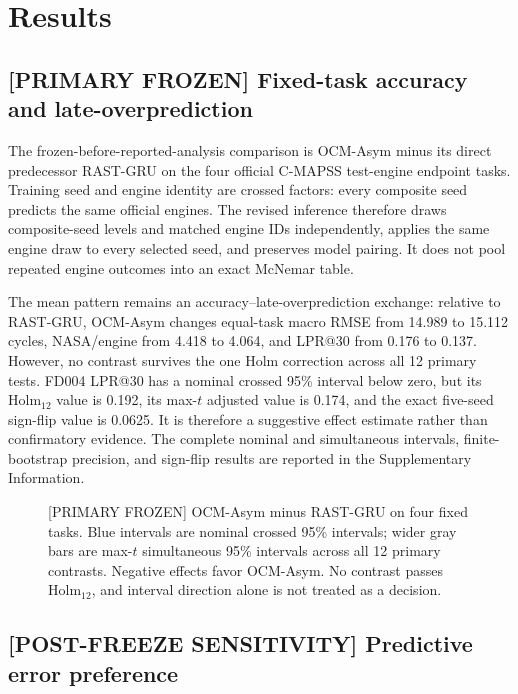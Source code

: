 
\FloatBarrier
\section{Results}

\subsection{[PRIMARY FROZEN] Fixed-task accuracy and late-overprediction}

The frozen-before-reported-analysis comparison is OCM-Asym minus its direct predecessor RAST-GRU on the four official C-MAPSS test-engine endpoint tasks. Training seed and engine identity are crossed factors: every composite seed predicts the same official engines. The revised inference therefore draws composite-seed levels and matched engine IDs independently, applies the same engine draw to every selected seed, and preserves model pairing. It does not pool repeated engine outcomes into an exact McNemar table.

The mean pattern remains an accuracy--late-overprediction exchange: relative to RAST-GRU, OCM-Asym changes equal-task macro RMSE from 14.989 to 15.112 cycles, NASA/engine from 4.418 to 4.064, and LPR@30 from 0.176 to 0.137. However, no contrast survives the one Holm correction across all 12 primary tests. FD004 LPR@30 has a nominal crossed 95\% interval below zero, but its Holm$_{12}$ value is 0.192, its max-$t$ adjusted value is 0.174, and the exact five-seed sign-flip value is 0.0625. It is therefore a suggestive effect estimate rather than confirmatory evidence. The complete nominal and simultaneous intervals, finite-bootstrap precision, and sign-flip results are reported in the Supplementary Information.

\begin{figure}[!t]
\centering
{}
\caption{[PRIMARY FROZEN] OCM-Asym minus RAST-GRU on four fixed tasks. Blue intervals are nominal crossed 95\% intervals; wider gray bars are max-$t$ simultaneous 95\% intervals across all 12 primary contrasts. Negative effects favor OCM-Asym. No contrast passes Holm$_{12}$, and interval direction alone is not treated as a decision.}
\label{fig:round3-primary-crossed}
\end{figure}
\FloatBarrier

\subsection{[POST-FREEZE SENSITIVITY] Predictive error preference}

